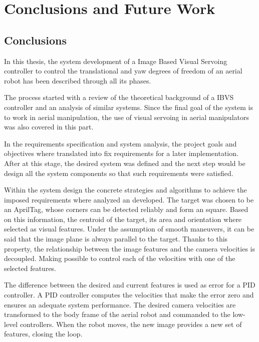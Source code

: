 
\chapter{Conclusions and Future Work}
\label{chap:conclusions-future-work}

\section{Conclusions}

In this thesis, the system development of a Image Based Visual Servoing controller to control the translational and yaw degrees of freedom of an aerial robot has been described through all its phases. 

The process started with a review of the theoretical background of a IBVS controller and an analysis of similar systems. Since the final goal of the system is to work in aerial manipulation, the use of visual servoing in aerial manipulators was also covered in this part.

In the requirements specification and system analysis, the project goals and objectives where translated into fix requirements for a later implementation. After at this stage, the desired system was defined and the next step would be design all the system components so that such requirements were satisfied.

Within the system design the concrete strategies and algorithms to achieve the imposed requirements where analyzed an developed. The target was chosen to be an AprilTag, whose corners can be detected reliably and form an square. Based on this information, the centroid of the target, its area and orientation where selected as visual features. Under the assumption of smooth maneuvers, it can be said that the image plane is always parallel to the target. Thanks to this property, the relationship between the image features and the camera velocities is decoupled. Making possible to control each of the velocities with one of the selected features.

The difference between the desired and current features is used as error for a PID controller. A PID controller computes the velocities that make the error zero and ensures an adequate system performance. The desired camera velocities are transformed to the body frame of the aerial robot and commanded to the low-level controllers. When the robot moves, the new image provides a new set of features, closing the loop.

